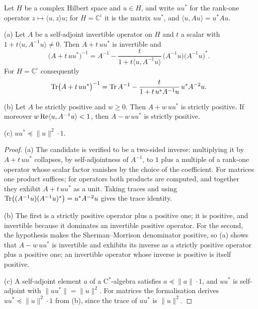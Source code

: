 \begin{lemma}
\label{lem:rank-one-updates}
\leanok
Let $H$ be a complex Hilbert space and $u \in H$, and write $u u^*$ for the rank-one
operator $z \mapsto \langle u, z \rangle u$; for $H = \mathbb{C}^{\iota}$ it is the matrix
$u u^*$, and $\langle u, A u \rangle = u^* A u$.

(a) Let $A$ be a self-adjoint invertible operator on $H$ and $t$ a scalar with
$1 + t \langle u, A^{-1} u \rangle \neq 0$. Then $A + t \, u u^*$ is invertible and
\[
  \bigl( A + t \, u u^* \bigr)^{-1}
    = A^{-1} - \frac{t}{1 + t \langle u, A^{-1} u \rangle} \,
      \bigl( A^{-1} u \bigr) \bigl( A^{-1} u \bigr)^* .
\]
For $H = \mathbb{C}^{\iota}$ consequently
\[
  \operatorname{Tr} \bigl( A + t \, u u^* \bigr)^{-1}
    = \operatorname{Tr} A^{-1} - \frac{t}{1 + t \, u^* A^{-1} u} \, u^* A^{-2} u .
\]

(b) Let $A$ be strictly positive and $w \geq 0$. Then $A + w \, u u^*$ is strictly positive.
If moreover $w \operatorname{Re} \langle u, A^{-1} u \rangle < 1$, then $A - w \, u u^*$ is strictly
positive.

(c) $u u^* \preceq \|u\|^2 \cdot 1$.
\end{lemma}

\begin{proof}
\leanok
{}
(a) The candidate is verified to be a two-sided inverse: multiplying it by
$A + t \, u u^*$ collapses, by self-adjointness of $A^{-1}$, to $1$ plus a multiple of a
rank-one operator whose scalar factor vanishes by the choice of the coefficient. For
matrices one product suffices; for operators both products are computed, and together they
exhibit $A + t \, u u^*$ as a unit. Taking traces and using
$\operatorname{Tr} \bigl( (A^{-1} u)(A^{-1} u)^* \bigr) = u^* A^{-2} u$ gives the trace identity.

(b) The first is a strictly positive operator plus a positive one; it is positive, and
invertible because it dominates an invertible positive operator. For the second, the
hypothesis makes the Sherman--Morrison denominator positive, so (a) shows that
$A - w \, u u^*$ is invertible and exhibits its inverse as a strictly positive operator plus
a positive one; an invertible operator whose inverse is positive is itself positive.

(c) A self-adjoint element $a$ of a C$^*$-algebra satisfies $a \preceq \|a\| \cdot 1$, and
$u u^*$ is self-adjoint with $\|u u^*\| = \|u\|^2$. For matrices the formalisation derives
$u u^* \preceq \|u\|^2 \cdot 1$ from (b), since the trace of
$u u^*$ is $\|u\|^2$.
\end{proof}


